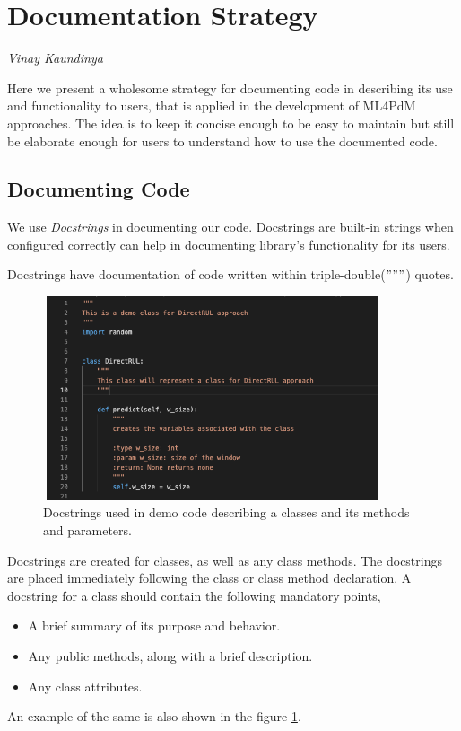 \section{Documentation Strategy}
\vspace*{-10mm}\hfill{\normalsize\emph{Vinay Kaundinya}}
\label{sec:quality_assurance:doc}

Here we present a wholesome strategy for documenting code in describing its use and functionality to users, that is applied in the development of ML4PdM approaches. The idea is to keep it concise enough to be easy to maintain but still be elaborate enough for users to understand how to use the documented code.

\subsection{Documenting Code}
We use \textit{Docstrings} in documenting our code. Docstrings are built-in strings when configured correctly can help in documenting library's functionality for its users.

Docstrings have documentation of code written within triple-double($"""$) quotes.
\begin{figure}[H]
	\centering
	\includegraphics[width=10cm,height=6cm]{gfx/ex_docstring.png}
	\caption{Docstrings used in demo code describing a classes and its methods and parameters.}
	\label{fig:docstring}
\end{figure}
Docstrings are created for classes, as well as any class methods. The docstrings are placed immediately following the class or class method declaration. A docstring for a class should contain the following mandatory points,
\begin{itemize}
	\item A brief summary of its purpose and behavior.
	\item Any public methods, along with a brief description.
	\item Any class attributes.
\end{itemize}
An example of the same is also shown in the figure \ref{fig:docstring}.

